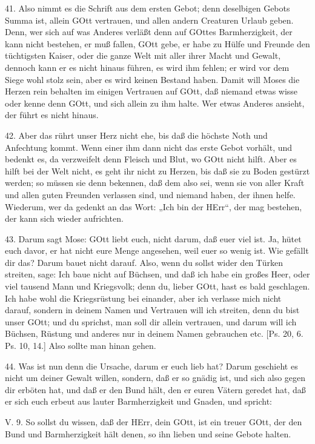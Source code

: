 41. Also nimmt es die Schrift aus dem ersten Gebot; denn deselbigen Gebots Summa ist, allein GOtt vertrauen, und allen andern Creaturen Urlaub geben. Denn, wer sich auf was Anderes verläßt denn auf GOttes Barmherzigkeit, der kann nicht bestehen, er muß fallen, GOtt gebe, er habe zu Hülfe und Freunde den tüchtigsten Kaiser, oder die ganze Welt mit aller ihrer Macht und Gewalt, dennoch kann er es nicht hinaus führen, es wird ihm fehlen; er wird vor dem Siege wohl stolz sein, aber es wird keinen Bestand haben. Damit will Moses die Herzen rein behalten im einigen Vertrauen auf GOtt, daß niemand etwas wisse oder kenne denn GOtt, und sich allein zu ihm halte. Wer etwas Anderes ansieht, der führt es nicht hinaus.

42. Aber das rührt unser Herz nicht ehe, bis daß die höchste Noth und Anfechtung kommt. Wenn einer ihm dann nicht das erste Gebot vorhält, und bedenkt es, da verzweifelt denn Fleisch und Blut, wo GOtt nicht hilft. Aber es hilft bei der Welt nicht, es geht ihr nicht zu Herzen, bis daß sie zu Boden gestürzt werden; so müssen sie denn bekennen, daß dem also sei, wenn sie von aller Kraft und allen guten Freunden verlassen sind, und niemand haben, der ihnen helfe. Wiederum, wer da gedenkt an das Wort: „Ich bin der HErr“, der mag bestehen, der kann sich wieder aufrichten.

43. Darum sagt Mose: GOtt liebt euch, nicht darum, daß euer viel ist. Ja, hütet euch davor, er hat nicht eure Menge angesehen, weil euer so wenig ist. Wie gefällt dir das? Darum bauet nicht darauf. Also, wenn du sollst wider den Türken streiten, sage: Ich baue nicht auf Büchsen, und daß ich habe ein großes Heer, oder viel tausend Mann und Kriegsvolk; denn du, lieber GOtt, hast es bald geschlagen. Ich habe wohl die Kriegsrüstung bei einander, aber ich verlasse mich nicht darauf, sondern in deinem Namen und Vertrauen will ich streiten, denn du bist unser GOtt; und du sprichst, man soll dir allein vertrauen, und darum will ich Büchsen, Rüstung und anderes nur in deinem Namen gebrauchen etc. [Ps. 20, 6. Ps. 10, 14.] Also sollte man hinan gehen.

44. Was ist nun denn die Ursache, darum er euch lieb hat? Darum geschieht es nicht um deiner Gewalt willen, sondern, daß er so gnädig ist, und sich also gegen dir erböten hat, und daß er den Bund hält, den er euren Vätern geredet hat, daß er sich euch erbeut aus lauter Barmherzigkeit und Gnaden, und spricht:

\begin{schriftzitat}
V. 9. So sollst du wissen, daß der HErr, dein GOtt, ist ein treuer GOtt, der den Bund und Barmherzigkeit hält denen, so ihn lieben und seine Gebote halten.
\end{schriftzitat}

